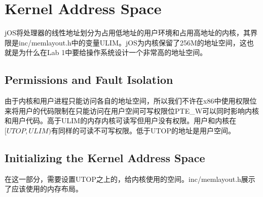 \section{Kernel Address Space}
\label{sec:kernel_address_space}
\par jOS将处理器的线性地址划分为占用低地址的用户环境和占用高地址的内核，其界限是inc/memlayout.h中的变量ULIM。jOS为内核保留了256M的地址空间，这也就是为什么在Lab 1中要给操作系统设计一个非常高的地址空间。

\subsection{Permissions and Fault Isolation}
\label{sub:permissions_and_fault_isolation}
\par 由于内核和用户进程只能访问各自的地址空间，所以我们不许在x86中使用权限位来将用户的代码限制在只能访问在用户空间可写权限位PTE\_W可以同时影响内核和用户代码。高于ULIM的内存内核可读写但用户没有权限。用户和内核在$[UTOP, ULIM)$有同样的可读不可写权限。低于UTOP的地址是用户空间。

\subsection{Initializing the Kernel Address Space}
\label{sub:initializing_the_kernel_address_space}

\par 在这一部分，需要设置UTOP之上的，给内核使用的空间。inc/memlayout.h展示了应该使用的内存布局。

